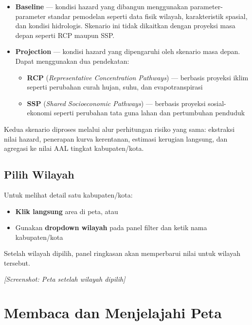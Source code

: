 \documentclass[12pt, a4paper]{article}
\newcommand{\screenshot}[1]{%
    \begin{center}
      \begin{tcolorbox}[
        enhanced,
        colback  = sectiongray,
        colframe = padisborder,
        arc      = 6pt,
        boxrule  = 0.6pt,
        height   = 5.5cm,
        valign   = center,
        halign   = center,
        fontupper = \sffamily\small\color{padismuted},
      ]
        \textit{[Screenshot: #1]}
      \end{tcolorbox}
    \end{center}%
  }
\begin{document}
  \begin{itemize}
    \item \textbf{Baseline} — kondisi hazard yang dibangun menggunakan parameter-parameter
      standar pemodelan seperti data fisik wilayah, karakteristik spasial, dan kondisi
      hidrologis. Skenario ini tidak dikaitkan dengan proyeksi masa depan seperti RCP maupun SSP.

    \item \textbf{Projection} — kondisi hazard yang dipengaruhi oleh skenario masa depan.
      Dapat menggunakan dua pendekatan:
      \begin{itemize}
        \item \textbf{RCP} (\textit{Representative Concentration Pathways}) — berbasis proyeksi
          iklim seperti perubahan curah hujan, suhu, dan evapotranspirasi
        \item \textbf{SSP} (\textit{Shared Socioeconomic Pathways}) — berbasis proyeksi
          sosial-ekonomi seperti perubahan tata guna lahan dan pertumbuhan penduduk
      \end{itemize}
  \end{itemize}

  \begin{notebox}
    Kedua skenario diproses melalui alur perhitungan risiko yang sama: ekstraksi nilai hazard,
    penerapan kurva kerentanan, estimasi kerugian langsung, dan agregasi ke nilai AAL
    tingkat kabupaten/kota.
  \end{notebox}

  \subsection{Pilih Wilayah}

  Untuk melihat detail satu kabupaten/kota:
  \begin{itemize}
    \item \textbf{Klik langsung} area di peta, atau
    \item Gunakan \textbf{dropdown wilayah} pada panel filter dan ketik nama kabupaten/kota
  \end{itemize}

  Setelah wilayah dipilih, panel ringkasan akan memperbarui nilai untuk wilayah tersebut.

  \screenshot{Peta setelah wilayah dipilih}

  \newpage

  \section{Membaca dan Menjelajahi Peta}
\end{document}
